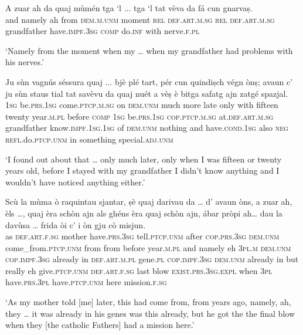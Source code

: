\begin{linenumbers}
\gll A zuar ah da quaj mùmén tga `l ... tga `l tat vèva da fá cun gnarvaṣ. \\
and namely ah from \textsc{dem.m.unm} moment \textsc{rel} \textsc{def.art.m.sg} {} \textsc{rel} \textsc{def.art.m.sg} grandfather have.\textsc{impf.3sg} \textsc{comp} do.\textsc{inf} with nerve.\textsc{f.pl} \\ 
\end{linenumbers}
\medskip
\glt `Namely from the moment when my … when my grandfather had problems with his nerves.'
\medskip

\begin{linenumbers}
\gll  Ju sùn vagnús séssura quaj ... bjè plé tart, pér cun quindiṣch végn ònṣ; avaun c’ ju sùn staus tial tat savèvu da quaj nuét a vèṣ è bitga safatg ajn zatgé spazjal.\\
  \textsc{1sg} be.\textsc{prs.1sg} come.\textsc{ptcp.m.sg} on \textsc{dem.unm} {} much more late only with fifteen twenty year.\textsc{m.pl} before \textsc{comp} \textsc{1sg} be.\textsc{prs.1sg} \textsc{cop.ptcp.m.sg} at.\textsc{def.art.m.sg} grandfather know.\textsc{impf.1sg.1sg} of \textsc{dem.unm} nothing and have.\textsc{cond.1sg} also \textsc{neg} \textsc{refl.}do.\textsc{ptcp.unm} in something special.\textsc{adj.unm}\\
\end{linenumbers}
\medskip
\glt `I found out about that … only much later, only when I was fifteen or twenty years old, before I stayed with my grandfather I didn’t know anything and I wouldn’t have noticed anything either.'
\medskip

\begin{linenumbers}
\gll  Scù la mùma ò raquintau sjantar, ṣè quaj darivau da … d’ avaun òns, a zuar ah, èls …, quaj èra schòn ajn als ghéns èra quaj schòn ajn, ábar pròpi ah… dau la davùsa … frida òi c’ i òn gju cò misjun.  \\
as \textsc{def.art.f.sg} mother have.\textsc{prs.3sg} tell.\textsc{ptcp.unm} after \textsc{cop.prs.3sg} \textsc{dem.unm} come\_from.\textsc{ptcp.unm} from {} from before year.\textsc{m.pl} and namely eh \textsc{3pl.m} {} \textsc{dem.unm} \textsc{cop.impf.3sg} already in \textsc{def.art.m.pl} gene.\textsc{pl} \textsc{cop.impf.3sg} \textsc{dem.unm} already in but really eh give.\textsc{ptcp.unm} \textsc{def.art.f.sg} last {} blow  \textsc{exist.prs.3sg.expl} when \textsc{3pl} have.\textsc{prs.3pl} have.\textsc{ptcp.unm} here mission.\textsc{f.sg}  \\
\end{linenumbers}
\medskip
\glt `As my mother told [me] later, this had  come from, from years ago, namely, ah, they … it was already in his genes was this already, but he got the the final blow when they [the catholic Fathers] had a mission here.'
\medskip

